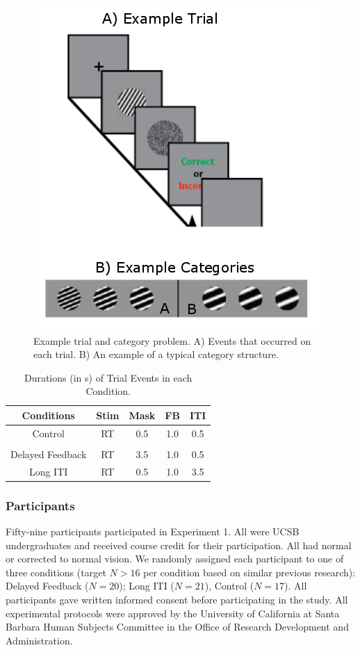 \documentclass[doc, floatsintext]{apa7}
\begin{document}
\begin{figure}
  \centering
  \includegraphics[width=.5\textwidth]{../figures/fig_design_exp_1.png}
  \caption{
      Example trial and category problem. A) Events that
      occurred on each trial. B) An example of a typical
      category structure.
}
  \label{fig:trial}
\end{figure}

\begin{table}
    \caption{
        Durations (in s) of Trial Events in each Condition.
    }
    \label{conditions_exp_1}
    \begin{tabular}{c|cccc}
        Conditions & Stim & Mask & FB & ITI \\[0.5ex] \hline Control & RT & 0.5 &
        1.0 & 0.5 \\[0.5ex]
        \\[-1.5ex] Delayed Feedback &
        RT & 3.5 & 1.0 & 0.5 \\[0.5ex]   Long ITI & RT & 0.5 & 1.0 & 3.5
        \\[0.5ex]
    \end{tabular}
\end{table}

\subsubsection{Participants}
Fifty-nine participants participated in Experiment 1. All
were UCSB undergraduates and received course credit for
their participation. All had normal or corrected to normal
vision. We randomly assigned each participant to one of
three conditions (target $N>16$ per condition based on
similar previous research): Delayed Feedback ($N = 20$);
Long ITI ($N = 21$), Control ($ N = 17$). All participants
gave written informed consent before participating in the
study. All experimental protocols were approved by the
University of California at Santa Barbara Human Subjects
Committee in the Office of Research Development and
Administration.
\end{document}

